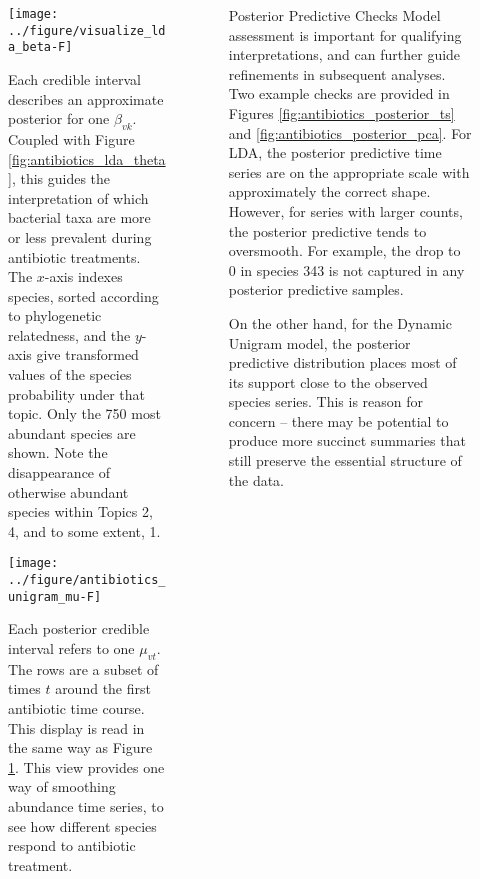 \documentclass[final, 8pt]{beamer}
\newlength{\onecolwid}
\begin{document}
\begin{frame}
\begin{columns}
\begin{column}{\onecolwid}
\begin{figure}[!p]
  \centering\texttt{[image: ../figure/visualize\_lda\_beta-F]}
  \caption{Each credible interval describes an approximate posterior for one
    $\beta_{vk}$. Coupled with Figure \ref{fig:antibiotics_lda_theta}, this
    guides the interpretation of which bacterial taxa are more or less prevalent
    during antibiotic treatments. The $x$-axis indexes species, sorted according
    to phylogenetic relatedness, and the $y$-axis give transformed values of the
    species probability under that topic. Only the 750 most abundant species are
    shown. Note the disappearance of otherwise abundant species within Topics 2,
    4, and to some extent, 1.} \label{fig:antibiotics_lda_beta}
\end{figure}

\begin{figure}[ht]
  \centering
  \texttt{[image: ../figure/antibiotics\_unigram\_mu-F]}
  \caption{Each posterior credible interval refers to one $\mu_{vt}$. The rows
    are a subset of times $t$ around the first antibiotic time course. This
    display is read in the same way as Figure \ref{fig:antibiotics_lda_beta}.
    This view provides one way of smoothing abundance time series, to see how
    different species respond to antibiotic
    treatment. \label{fig:antibiotics_unigram_theta} }
\end{figure}


\end{column}

\begin{column}{\onecolwid}

\begin{block}{Posterior Predictive Checks}
Model assessment is important for qualifying interpretations, and can further
guide refinements in subsequent analyses. Two example checks are provided in
Figures \ref{fig:antibiotics_posterior_ts} and
\ref{fig:antibiotics_posterior_pca}. For LDA, the posterior predictive time
series are on the appropriate scale with approximately the correct shape.
However, for series with larger counts, the posterior predictive tends to
oversmooth. For example, the drop to 0 in species 343 is not captured in any
posterior predictive samples.

On the other hand, for the Dynamic Unigram model, the posterior predictive
distribution places most of its support close to the observed species series.
This is reason for concern -- there may be potential to produce more succinct
summaries that still preserve the essential structure of the data.


\end{block}
\end{column}
\end{columns}
\end{frame}
\end{document}
